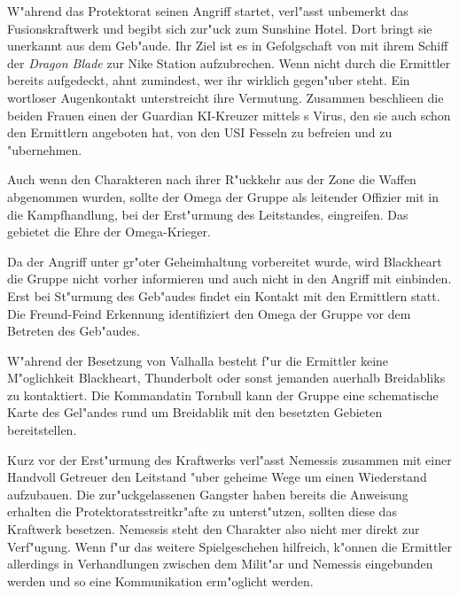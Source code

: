 W"ahrend das Protektorat seinen Angriff startet, verl"asst \xl{} unbemerkt das Fusionskraftwerk und begibt sich zur"uck zum Sunshine Hotel. Dort bringt sie \ml{} unerkannt aus dem Geb"aude. Ihr Ziel ist es in Gefolgschaft von \ml{} mit ihrem Schiff der \emph{Dragon Blade} zur Nike Station aufzubrechen. Wenn nicht durch die Ermittler bereits aufgedeckt, ahnt \ml{} zumindest, wer ihr wirklich gegen"uber steht. Ein wortloser Augenkontakt unterstreicht ihre Vermutung. Zusammen beschlie\3en die beiden Frauen einen der Guardian KI-Kreuzer mittels \ml{}s Virus, den sie auch schon den Ermittlern angeboten hat, von den USI Fesseln zu befreien und zu "ubernehmen. 

\begin{remarks}
	Auch wenn den Charakteren nach ihrer R"uckkehr aus der Zone die Waffen abgenommen wurden, sollte der Omega der Gruppe als leitender Offizier mit in die Kampfhandlung, bei der Erst"urmung des Leitstandes, eingreifen. Das gebietet die Ehre der Omega-Krieger.
	
	Da der Angriff unter gr"o\3ter Geheimhaltung vorbereitet wurde, wird Blackheart die Gruppe nicht vorher informieren und auch nicht in den Angriff mit einbinden. Erst bei St"urmung des Geb"audes findet ein Kontakt mit den Ermittlern statt. Die Freund-Feind Erkennung identifiziert den Omega der Gruppe vor dem Betreten des Geb"audes. 
	
	W"ahrend der Besetzung von Valhalla besteht f"ur die Ermittler keine M"oglichkeit Blackheart, Thunderbolt oder sonst jemanden au\3erhalb Breidabliks zu kontaktiert. Die Kommandatin Tornbull kann der Gruppe eine schematische Karte des Gel"andes rund um Breidablik mit den besetzten Gebieten bereitstellen.

	Kurz vor der Erst"urmung des Kraftwerks verl"asst Nemessis zusammen mit einer Handvoll Getreuer den Leitstand "uber geheime Wege um einen Wiederstand aufzubauen. Die zur"uckgelassenen Gangster haben bereits die Anweisung erhalten die Protektoratsstreitkr"afte zu unterst"utzen, sollten diese das Kraftwerk besetzen. Nemessis steht den Charakter also nicht mer direkt zur Verf"ugung. Wenn f"ur das weitere Spielgeschehen hilfreich, k"onnen die Ermittler allerdings in Verhandlungen zwischen dem Milit"ar und Nemessis eingebunden werden und so eine Kommunikation erm"oglicht werden. 
\end{remarks}
